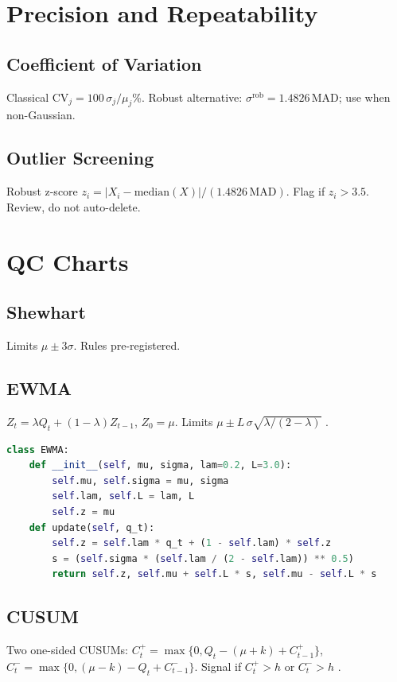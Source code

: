 \documentclass[11pt]{article}
\begin{document}
\section{Precision and Repeatability}
\subsection{Coefficient of Variation}
Classical $\mathrm{CV}_j = 100\,\sigma_j/\mu_j$\%. Robust alternative: $\sigma^{\mathrm{rob}}=1.4826\,\mathrm{MAD}$; use when non-Gaussian.

\subsection{Outlier Screening}
Robust z-score $z_i = \lvert X_i-\mathrm{median}(X)\rvert/(1.4826\,\mathrm{MAD})$. Flag if $z_i>3.5$. Review, do not auto-delete.

\section{QC Charts}
\subsection{Shewhart} Limits $\mu\pm3\sigma$. Rules pre-registered.

\subsection{EWMA}
$Z_t = \lambda Q_t + (1-\lambda)Z_{t-1}$, $Z_0=\mu$. Limits $\mu\pm L\,\sigma\sqrt{\lambda/(2-\lambda)}$ \cite{Roberts1959,LucasSaccucci1990}.

\begin{lstlisting}[language=Python,caption={Streaming EWMA with limits}]
class EWMA:
    def __init__(self, mu, sigma, lam=0.2, L=3.0):
        self.mu, self.sigma = mu, sigma
        self.lam, self.L = lam, L
        self.z = mu
    def update(self, q_t):
        self.z = self.lam * q_t + (1 - self.lam) * self.z
        s = (self.sigma * (self.lam / (2 - self.lam)) ** 0.5)
        return self.z, self.mu + self.L * s, self.mu - self.L * s
\end{lstlisting}

\subsection{CUSUM}
Two one-sided CUSUMs: $C_t^{+}=\max\{0, Q_t-(\mu+k)+C_{t-1}^{+}\}$, $C_t^{-}=\max\{0,(\mu-k)-Q_t+C_{t-1}^{-}\}$. Signal if $C_t^{+}>h$ or $C_t^{-}>h$ \cite{Page1954}.
\end{document}
